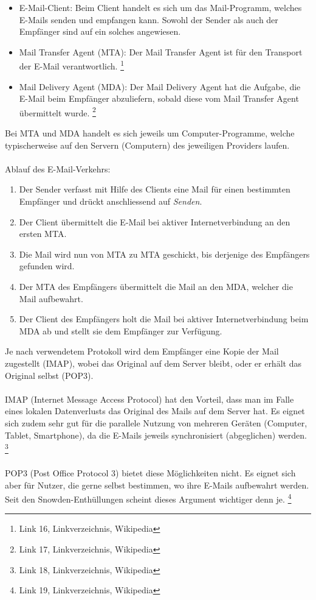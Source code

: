 \begin{itemize}
\item E-Mail-Client: Beim Client handelt es sich um das Mail-Programm, welches E-Mails senden und empfangen kann. Sowohl der Sender als auch der Empfänger sind auf ein solches angewiesen.
\item Mail Transfer Agent (MTA): Der Mail Transfer Agent ist für den Transport der E-Mail verantwortlich.
\footnote{Link 16, Linkverzeichnis, Wikipedia}
\item Mail Delivery Agent (MDA): Der Mail Delivery Agent hat die Aufgabe, die E-Mail beim Empfänger abzuliefern, sobald diese vom Mail Transfer Agent übermittelt wurde.
\footnote{Link 17, Linkverzeichnis, Wikipedia}
\end{itemize}

Bei MTA und MDA handelt es sich jeweils um Computer-Programme, welche typischerweise auf den Servern (Computern) des jeweiligen Providers laufen.
\\
\\
Ablauf des E-Mail-Verkehrs:

\begin{enumerate}
\item Der Sender verfasst mit Hilfe des Clients eine Mail für einen bestimmten Empfänger und drückt anschliessend auf \textit{Senden}.
\item Der Client übermittelt die E-Mail bei aktiver Internetverbindung an den ersten MTA.
\item Die Mail wird nun von MTA zu MTA geschickt, bis derjenige des Empfängers gefunden wird.
\item Der MTA des Empfängers übermittelt die Mail an den MDA, welcher die Mail aufbewahrt.
\item Der Client des Empfängers holt die Mail bei aktiver Internetverbindung beim MDA ab und stellt sie dem Empfänger zur Verfügung.
\end{enumerate}

Je nach verwendetem Protokoll wird dem Empfänger eine Kopie der Mail zugestellt (IMAP), wobei das Original auf dem Server bleibt, oder er erhält das Original selbst (POP3).
\\
\\
IMAP (Internet Message Access Protocol) hat den Vorteil, dass man im Falle eines lokalen Datenverlusts das Original des Mails auf dem Server hat. Es eignet sich zudem sehr gut für die parallele Nutzung von mehreren Geräten (Computer, Tablet, Smartphone), da die E-Mails jeweils synchronisiert (abgeglichen) werden.
\footnote{Link 18, Linkverzeichnis, Wikipedia}
\\
\\
POP3 (Post Office Protocol 3) bietet diese Möglichkeiten nicht. Es eignet sich aber für Nutzer, die gerne selbst bestimmen, wo ihre E-Mails aufbewahrt werden. Seit den Snowden-Enthüllungen scheint dieses Argument wichtiger denn je.
\footnote{Link 19, Linkverzeichnis, Wikipedia}


